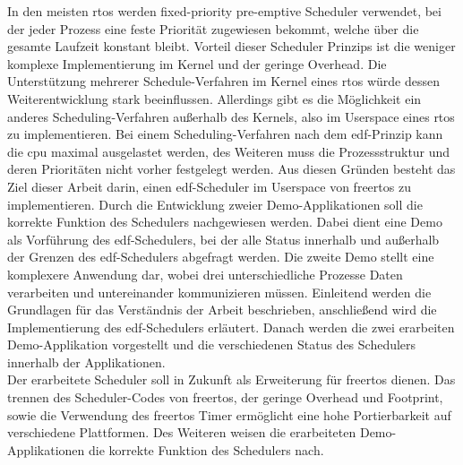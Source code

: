 \documentclass[../EDF Master Thesis.tex]{subfiles}
\begin{document}
    In den meisten \ac{rtos} werden fixed-priority pre-emptive Scheduler verwendet, bei der jeder Prozess eine feste Priorität zugewiesen bekommt, welche über die gesamte Laufzeit konstant bleibt.
    Vorteil dieser Scheduler Prinzips ist die weniger komplexe Implementierung im Kernel und der geringe Overhead.
    Die Unterstützung mehrerer Schedule-Verfahren im Kernel eines \ac{rtos} würde dessen Weiterentwicklung stark beeinflussen.
    Allerdings gibt es die Möglichkeit ein anderes Scheduling-Verfahren außerhalb des Kernels, also im Userspace eines \ac{rtos} zu implementieren.
    Bei einem Scheduling-Verfahren nach dem \ac{edf}-Prinzip kann die \ac{cpu} maximal ausgelastet werden, des Weiteren muss die Prozessstruktur und deren Prioritäten nicht vorher festgelegt werden.
    Aus diesen Gründen besteht das Ziel dieser Arbeit darin, einen \ac{edf}-Scheduler im Userspace von \ac{freertos} zu implementieren.
    Durch die Entwicklung zweier Demo-Applikationen soll die korrekte Funktion des Schedulers nachgewiesen werden.
    Dabei dient eine Demo als Vorführung des \ac{edf}-Schedulers, bei der alle Status innerhalb und außerhalb der Grenzen des \ac{edf}-Schedulers abgefragt werden.
    Die zweite Demo stellt eine komplexere Anwendung dar, wobei drei unterschiedliche Prozesse Daten verarbeiten und untereinander kommunizieren müssen. 
    Einleitend werden die Grundlagen für das Verständnis der Arbeit beschrieben, anschließend wird die Implementierung des \ac{edf}-Schedulers erläutert.
    Danach werden die zwei erarbeiten Demo-Applikation vorgestellt und die verschiedenen Status des Schedulers innerhalb der Applikationen.\\
    Der erarbeitete Scheduler soll in Zukunft als Erweiterung für \ac{freertos} dienen.
    Das trennen des Scheduler-Codes von \ac{freertos}, der geringe Overhead und Footprint, sowie die Verwendung des \ac{freertos} Timer ermöglicht eine hohe Portierbarkeit auf verschiedene Plattformen.
    Des Weiteren weisen die erarbeiteten Demo-Applikationen die korrekte Funktion des Schedulers nach.
\end{document}

